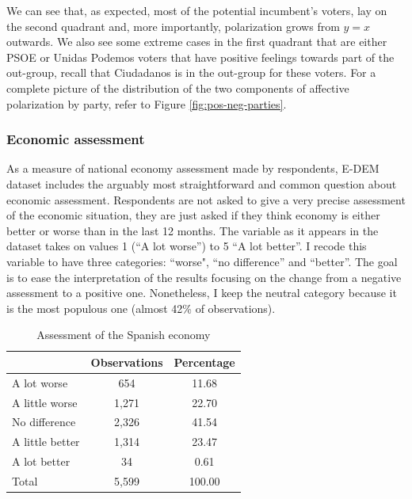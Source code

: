 \documentclass[a4paper, svgnames]{article}
\begin{document}
We can see that, as expected, most of the potential incumbent's voters, lay on the second quadrant and, more importantly, polarization grows from $y=x$ outwards. We also see some extreme cases in the first quadrant that are either PSOE or Unidas Podemos voters that have positive feelings towards part of the out-group, recall that Ciudadanos is in the out-group for these voters. For a complete picture of the distribution of the two components of affective polarization by party, refer to Figure \ref{fig:pos-neg-parties}.

\subsubsection{Economic assessment}

As a measure of national economy assessment made by respondents, E-DEM dataset includes the arguably most straightforward and common question about economic assessment. Respondents are not asked to give a very precise assessment of the economic situation, they are just asked if they think economy is either better or worse than in the last 12 months.
The variable as it appears in the dataset takes on values 1 (``A lot worse'') to 5 ``A lot better''. I recode this variable to have three categories: ``worse", ``no difference'' and ``better''. The goal is to ease the interpretation of the results focusing on the change from a negative assessment to a positive one. Nonetheless, I keep the neutral category because it is the most populous one (almost 42\% of observations).


\begin{table}[H]
	\centering
	\caption{Assessment of the Spanish economy}
	\label{tab:economic assessment}
	\begin{tabular}{@{}lcc@{}}
		\toprule
		                & Observations & Percentage \\ \midrule
		A lot worse     & 654          & 11.68      \\
		A little worse  & 1,271        & 22.70      \\
		No difference   & 2,326        & 41.54      \\
		A little better & 1,314        & 23.47      \\
		A lot better    & 34           & 0.61       \\
		Total           & 5,599        & 100.00     \\ \bottomrule
	\end{tabular}
\end{table}
\end{document}
